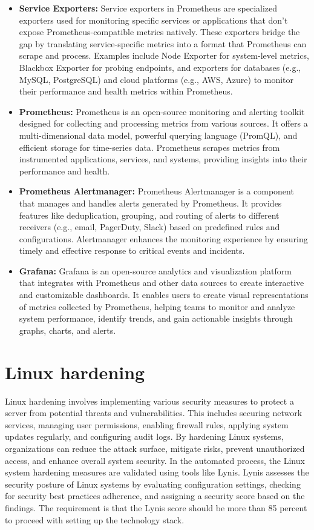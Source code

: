 \documentclass[12pt,a4paper,oneside]{report}
\begin{document}
\begin{itemize}
\item \textbf{Service Exporters: }Service exporters in Prometheus are specialized exporters used for monitoring specific services or applications that don't expose Prometheus-compatible metrics natively. These exporters bridge the gap by translating service-specific metrics into a format that Prometheus can scrape and process. Examples include Node Exporter for system-level metrics, Blackbox Exporter for probing endpoints, and exporters for databases (e.g., MySQL, PostgreSQL) and cloud platforms (e.g., AWS, Azure) to monitor their performance and health metrics within Prometheus.
\item \textbf{Prometheus: }Prometheus is an open-source monitoring and alerting toolkit designed for collecting and processing metrics from various sources. It offers a multi-dimensional data model, powerful querying language (PromQL), and efficient storage for time-series data. Prometheus scrapes metrics from instrumented applications, services, and systems, providing insights into their performance and health.
\item \textbf{Prometheus Alertmanager: }Prometheus Alertmanager is a component that manages and handles alerts generated by Prometheus. It provides features like deduplication, grouping, and routing of alerts to different receivers (e.g., email, PagerDuty, Slack) based on predefined rules and configurations. Alertmanager enhances the monitoring experience by ensuring timely and effective response to critical events and incidents.
\item \textbf{Grafana: }Grafana is an open-source analytics and visualization platform that integrates with Prometheus and other data sources to create interactive and customizable dashboards. It enables users to create visual representations of metrics collected by Prometheus, helping teams to monitor and analyze system performance, identify trends, and gain actionable insights through graphs, charts, and alerts.
\end{itemize}


\section{Linux hardening}
\par Linux hardening involves implementing various security measures to protect a server from potential threats and vulnerabilities. This includes securing network services, managing user permissions, enabling firewall rules, applying system updates regularly, and configuring audit logs. By hardening Linux systems, organizations can reduce the attack surface, mitigate risks, prevent unauthorized access, and enhance overall system security. In the automated process, the Linux system hardening measures are validated using tools like Lynis. Lynis assesses the security posture of Linux systems by evaluating configuration settings, checking for security best practices adherence, and assigning a security score based on the findings. The requirement is that the Lynis score should be more than 85 percent to proceed with setting up the technology stack.
\end{document}
